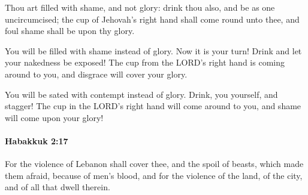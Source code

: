 			\begin{versebox}
					\item[BHS] 
					\item[LXX] 
					\item[ASV] Thou art filled with shame, and not glory: drink thou also, and be as one uncircumcised; the cup of Jehovah's right hand shall come round unto thee, and foul shame shall be upon thy glory.
					\item[NIV] You will be filled with shame instead of glory. Now it is your turn! Drink and let your nakedness be exposed! The cup from the LORD’s right hand is coming around to you, and disgrace will cover your glory.
					\item[NRSV] You will be sated with contempt instead of glory. Drink, you yourself, and stagger! The cup in the LORD’s right hand will come around to you, and shame will come upon your glory!
			\end{versebox}

		\paragraph{Habakkuk 2:17} %
			\label{HABAKKUK-2-17}

			For the violence of Lebanon shall cover thee, and the spoil of beasts, which made them afraid, because of men’s blood, and for the violence of the land, of the city, and of all that dwell therein.

